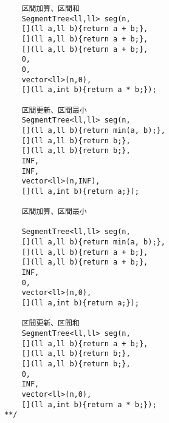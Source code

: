 \documentclass[10pt]{article}
\begin{document}
\begin{lstlisting}
	区間加算、区間和
	SegmentTree<ll,ll> seg(n,
	[](ll a,ll b){return a + b;},
	[](ll a,ll b){return a + b;},
	[](ll a,ll b){return a + b;},
	0,
	0,
	vector<ll>(n,0),
	[](ll a,int b){return a * b;});

	区間更新、区間最小
	SegmentTree<ll,ll> seg(n,
	[](ll a,ll b){return min(a, b);},
	[](ll a,ll b){return b;},
	[](ll a,ll b){return b;},
	INF,
	INF,
	vector<ll>(n,INF),
	[](ll a,int b){return a;});

	区間加算、区間最小

	SegmentTree<ll,ll> seg(n,
	[](ll a,ll b){return min(a, b);},
	[](ll a,ll b){return a + b;},
	[](ll a,ll b){return a + b;},
	INF,
	0,
	vector<ll>(n,0),
	[](ll a,int b){return a;});

	区間更新、区間和
	SegmentTree<ll,ll> seg(n,
	[](ll a,ll b){return a + b;},
	[](ll a,ll b){return b;},
	[](ll a,ll b){return b;},
	0,
	INF,
	vector<ll>(n,0),
	[](ll a,int b){return a * b;});
**/
\end{lstlisting}
\end{document}
